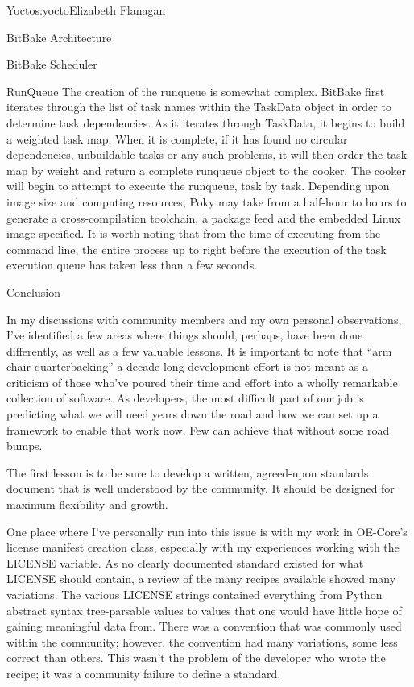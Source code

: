 \begin{aosachapter}{Yocto}{s:yocto}{Elizabeth Flanagan}
\begin{aosasect1}{BitBake Architecture}
\begin{aosasect2}{BitBake Scheduler}
\begin{aosasect3}{RunQueue}
The creation of the runqueue is somewhat complex. BitBake first
iterates through the list of task names within the TaskData object in
order to determine task dependencies. As it iterates through TaskData,
it begins to build a weighted task map. When it is complete, if it has
found no circular dependencies, unbuildable tasks or any such
problems, it will then order the task map by weight and return a
complete runqueue object to the cooker. The cooker will begin to
attempt to execute the runqueue, task by task. Depending upon image
size and computing resources, Poky may take from a half-hour to hours
to generate a cross-compilation toolchain, a package feed and
the embedded Linux image specified. It is worth noting that from the
time of executing  from the command line,
the entire process up to right before the execution of the task
execution queue has taken less than a few seconds.

\end{aosasect3}

\end{aosasect2}

\end{aosasect1}

\begin{aosasect1}{Conclusion}

In my discussions with community members and my own personal
observations, I've identified a few areas where things should, perhaps, have
been done differently, as well as a few valuable lessons. It is
important to note that ``arm chair quarterbacking'' a decade-long
development effort is not meant as a criticism of those who've poured
their time and effort into a wholly remarkable collection of
software. As developers, the most difficult part of our job is
predicting what we will need years down the road and how we can set up
a framework to enable that work now. Few can achieve that without
some road bumps.

The first lesson is to be sure to develop a
written, agreed-upon standards document that is well understood 
by the community. It should be designed for maximum
flexibility and growth. 

One place where I've personally run into this
issue is with my work in OE-Core's license manifest creation class,
especially with my experiences working with the LICENSE variable.
As no clearly documented standard existed for what LICENSE should
contain, a review of the many recipes available showed many
variations. The various LICENSE strings contained everything from
Python abstract syntax tree-parsable values to values that one would
have little hope of gaining meaningful data from. There was a
convention that was commonly used within the community; however, the
convention had many variations, some less correct than others. This
wasn't the problem of the developer who wrote the recipe; it was a
community failure to define a standard.


\end{aosasect1}
\end{aosachapter}
